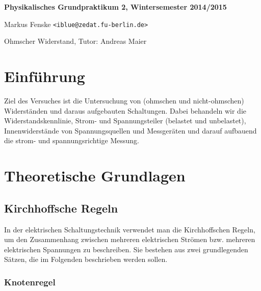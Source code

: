 \documentclass[a4paper,german,12pt,smallheadings]{scrartcl}
\begin{document}
\allowdisplaybreaks %
\begin{center}
\bfseries %
\sffamily %
\vspace{-40pt}
Physikalisches Grundpraktikum 2, Wintersemester 2014/2015

Markus Fenske \texttt{<iblue@zedat.fu-berlin.de>}

Ohmscher Widerstand, Tutor: Andreas Maier
\vspace{-10pt}
\end{center}
\section{Einführung}
Ziel des Versuches ist die Untersuchung von (ohmschen und nicht-ohmschen)
Widerständen und daraus aufgebauten Schaltungen. Dabei behandeln wir die
Widerstandskennlinie, Strom- und Spannungsteiler (belastet und unbelastet),
Innenwiderstände von Spannungsquellen und Messgeräten und darauf aufbauend die
strom- und spannungsrichtige Messung.

\section{Theoretische Grundlagen}

\subsection{Kirchhoffsche Regeln}
In der elektrischen Schaltungstechnik verwendet man die Kirchhoffschen
Regeln, um den Zusammenhang zwischen mehreren elektrischen Strömen bzw.
mehreren elektrischen Spannungen zu beschreiben. Sie bestehen aus zwei
grundlegenden Sätzen, die im Folgenden beschrieben werden sollen.

\subsubsection{Knotenregel}
\end{document}
